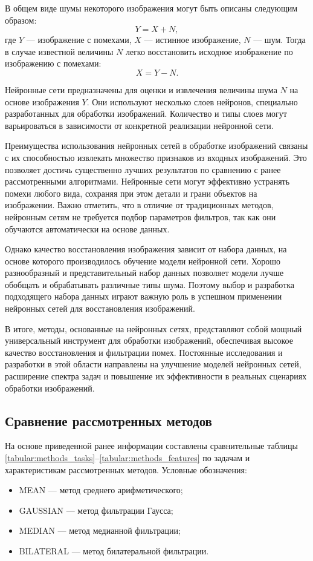 В общем виде шумы некоторого изображения могут быть описаны следующим образом:
\begin{equation}
    Y = X + N,
\end{equation}
где $Y$ --- изображение с помехами, $X$ --- истинное изображение, $N$ --- шум. Тогда в случае известной величины $N$ легко восстановить исходное изображение по изображению с помехами:
\begin{equation}
    X = Y - N.
\end{equation}

Нейронные сети предназначены для оценки и извлечения величины шума $N$ на основе изображения $Y$. Они используют несколько слоев нейронов, специально разработанных для обработки изображений. Количество и типы слоев могут варьироваться в зависимости от конкретной реализации нейронной сети.

Преимущества использования нейронных сетей в обработке изображений связаны с их способностью извлекать множество признаков из входных изображений. Это позволяет достичь существенно лучших результатов по сравнению с ранее рассмотренными алгоритмами. Нейронные сети могут эффективно устранять помехи любого вида, сохраняя при этом детали и грани объектов на изображении. Важно отметить, что в отличие от традиционных методов, нейронным сетям не требуется подбор параметров фильтров, так как они обучаются автоматически на основе данных.

Однако качество восстановления изображения зависит от набора данных, на основе которого производилось обучение модели нейронной сети. Хорошо разнообразный и представительный набор данных позволяет модели лучше обобщать и обрабатывать различные типы шума. Поэтому выбор и разработка подходящего набора данных играют важную роль в успешном применении нейронных сетей для восстановления изображений.

В итоге, методы, основанные на нейронных сетях, представляют собой мощный универсальный инструмент для обработки изображений, обеспечивая высокое качество восстановления и фильтрации помех. Постоянные исследования и разработки в этой области направлены на улучшение моделей нейронных сетей, расширение спектра задач и повышение их эффективности в реальных сценариях обработки изображений.

\subsection{Сравнение рассмотренных методов}

На основе приведенной ранее информации составлены сравнительные таблицы \ref{tabular:methods_tasks}--\ref{tabular:methods_features} по задачам и характеристикам рассмотренных методов. Условные обозначения:
\begin{itemize}
    \item MEAN --- метод среднего арифметического;
    \item GAUSSIAN --- метод фильтрации Гаусса;
    \item MEDIAN --- метод медианной фильтрации;
    \item BILATERAL --- метод билатеральной фильтрации.
\end{itemize}

